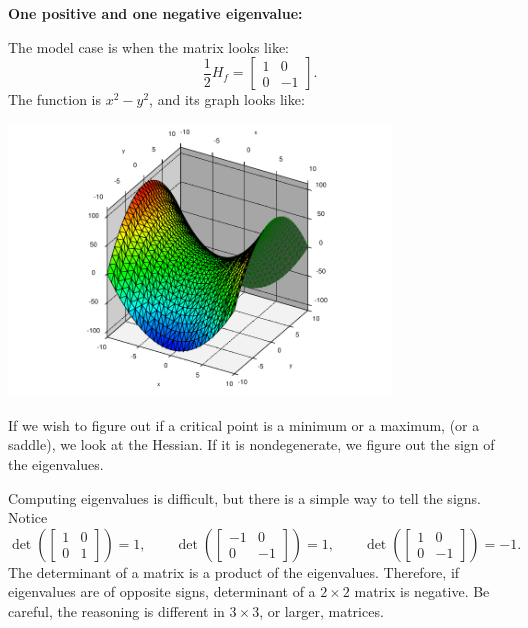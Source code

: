 \documentclass[12pt]{article}
\begin{document}
\bigskip

\pagebreak[2]
\textbf{One positive and one negative eigenvalue:}

The model case is when the matrix looks like:
\begin{equation*}
\frac{1}{2} H_f
=
\begin{bmatrix}
1 & 0 \\
0 & -1
\end{bmatrix} .
\end{equation*}
The function is $x^2-y^2$, and
its graph looks like:
\begin{center}
\includegraphics[width=4.0in]{xsqminusysq}
\end{center}

\bigskip

If we wish to figure out if a critical point is a minimum
or a maximum, (or a saddle), we look at the Hessian.  If it is
nondegenerate, we figure out the sign of the eigenvalues.

Computing eigenvalues is difficult, but there is a simple way to tell
the signs.  Notice
\begin{equation*}
\det\left(
\begin{bmatrix}
1 & 0 \\
0 & 1
\end{bmatrix}
\right) = 1,
\qquad
\det\left(
\begin{bmatrix}
-1 & 0 \\
0 & -1
\end{bmatrix}
\right) = 1,
\qquad
\det\left(
\begin{bmatrix}
1 & 0 \\
0 & -1
\end{bmatrix}
\right) = -1 .
\end{equation*}
The determinant of a matrix is a product of the eigenvalues.  Therefore, if
eigenvalues are of opposite signs, determinant of a $2 \times 2$ matrix is
negative.  Be careful, the reasoning is different in $3 \times 3$, or
larger, matrices.
\end{document}
